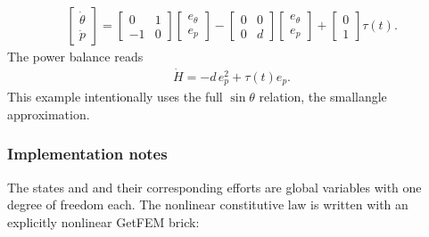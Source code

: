 \documentclass[letterpaper,10pt,english]{sphinxmanual}
\begin{document}
\begin{equation*}
\begin{split}\begin{bmatrix}\dot\theta\\\dot p\end{bmatrix}
=
\begin{bmatrix}0&1\\-1&0\end{bmatrix}
\begin{bmatrix}e_\theta\\e_p\end{bmatrix}
-
\begin{bmatrix}0&0\\0&d\end{bmatrix}
\begin{bmatrix}e_\theta\\e_p\end{bmatrix}
+
\begin{bmatrix}0\\1\end{bmatrix}\tau(t).\end{split}
\end{equation*}
\sphinxAtStartPar
The power balance reads
\begin{equation*}
\begin{split}\dot H=-d\,e_p^2+\tau(t)e_p.\end{split}
\end{equation*}
\sphinxAtStartPar
This example intentionally uses the full
\(\sin\theta\) relation,  the small\sphinxhyphen{}angle approximation.


\subsubsection{Implementation notes}
\label{\detokenize{examples/nonlinear_pendulum:implementation-notes}}
\sphinxAtStartPar
The states  and  and their corresponding efforts are
global  variables with one degree of freedom each. The
nonlinear constitutive law is written with an explicitly nonlinear
GetFEM brick:

\begin{sphinxVerbatim}[commandchars=\\\{\}]
        \PYG{p}{[}\PYG{p}{]} 
\end{sphinxVerbatim}
\end{document}
